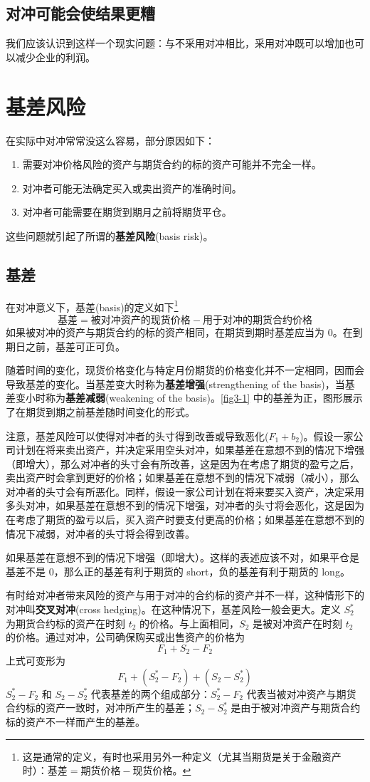 \subsection{对冲可能会使结果更糟}
我们应该认识到这样一个现实问题：与不采用对冲相比，采用对冲既可以增加也可以减少企业的利润。
\section{基差风险}
在实际中对冲常常没这么容易，部分原因如下：
\begin{enumerate}
    \item 需要对冲价格风险的资产与期货合约的标的资产可能并不完全一样。
    \item 对冲者可能无法确定买入或卖出资产的准确时间。
    \item 对冲者可能需要在期货到期月之前将期货平仓。
\end{enumerate}
这些问题就引起了所谓的\textbf{基差风险}(basis risk)。
\subsection{基差}
在对冲意义下，基差(basis)的定义如下\footnote{这是通常的定义，有时也采用另外一种定义（尤其当期货是关于金融资产时）：$\text{基差}=\text{期货价格}-\text{现货价格}$。}
$$\text{基差}=\text{被对冲资产的现货价格}-\text{用于对冲的期货合约价格}$$
如果被对冲的资产与期货合约的标的资产相同，在期货到期时基差应当为 0。在到期日之前，基差可正可负。

随着时间的变化，现货价格变化与特定月份期货的价格变化并不一定相同，因而会导致基差的变化。当基差变大时称为\textbf{基差增强}(strengthening of the basis)，当基差变小时称为\textbf{基差减弱}(weakening of the basis)。\autoref{fig3-1} 中的基差为正，图形展示了在期货到期之前基差随时间变化的形式。

注意，基差风险可以使得对冲者的头寸得到改善或导致恶化($F_1+b_2$)。假设一家公司计划在将来卖出资产，并决定采用空头对冲，如果基差在意想不到的情况下增强（即增大），那么对冲者的头寸会有所改善，这是因为在考虑了期货的盈亏之后，卖出资产时会拿到更好的价格；如果基差在意想不到的情况下减弱（减小），那么对冲者的头寸会有所恶化。同样，假设一家公司计划在将来要买入资产，决定采用多头对冲，如果基差在意想不到的情况下增强，对冲者的头寸将会恶化，这是因为在考虑了期货的盈亏以后，买入资产时要支付更高的价格；如果基差在意想不到的情况下减弱，对冲者的头寸将会得到改善。
\begin{tcolorbox}
    如果基差在意想不到的情况下增强（即增大）。这样的表述应该不对，如果平仓是基差不是 0，那么正的基差有利于期货的 short，负的基差有利于期货的 long。
\end{tcolorbox}
有时给对冲者带来风险的资产与用于对冲的合约标的资产并不一样，这种情形下的对冲叫\textbf{交叉对冲}(cross hedging)。在这种情况下，基差风险一般会更大。定义 $S_2^*$ 为期货合约标的资产在时刻 $t_2$ 的价格。与上面相同，$S_2$ 是被对冲资产在时刻 $t_2$ 的价格。通过对冲，公司确保购买或出售资产的价格为
$$F_1+S_2-F_2$$
上式可变形为
$$F_1+(S_2^*-F_2)+(S_2-S_2^*)$$
$S_2^*-F_2$ 和 $S_2-S_2^*$ 代表基差的两个组成部分：$S_2^*-F_2$ 代表当被对冲资产与期货合约标的资产一致时，对冲所产生的基差；$S_2-S_2^*$ 是由于被对冲资产与期货合约标的资产不一样而产生的基差。
